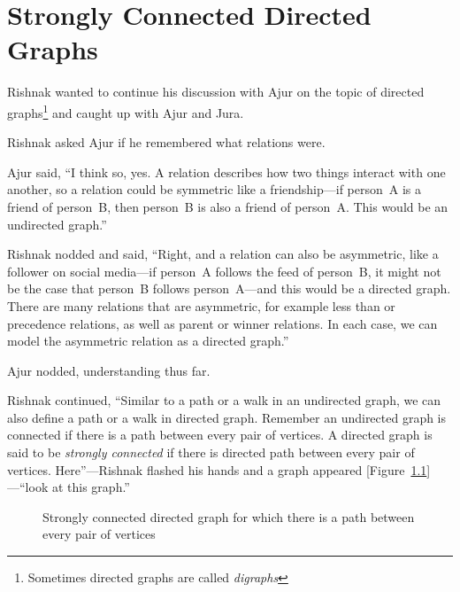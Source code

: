 \chapter{Strongly Connected Directed Graphs}
Rishnak wanted to continue his discussion with Ajur on the topic of directed graphs\footnote{Sometimes directed graphs are called \textit{digraphs}} and caught up with Ajur and Jura.

Rishnak asked Ajur if he remembered what relations were.

Ajur said, ``I think so, yes. A relation describes how two things interact with one another, so a relation could be symmetric like a friendship---if person~A is a friend of person~B, then person~B is also a friend of person~A. This would be an undirected graph.''

Rishnak nodded and said, ``Right, and a relation can also be asymmetric, like a follower on social media---if person~A follows the feed of person~B, it might not be the case that person~B follows person~A---and this would be a directed graph. There are many relations that are asymmetric, for example less than or precedence relations, as well as parent or winner relations. In each case, we can model the asymmetric relation as a directed graph.''

Ajur nodded, understanding thus far.

Rishnak continued, ``Similar to a path or a walk in an undirected graph, we can also define a path or a walk in directed graph. Remember an undirected graph is connected if there is a path between every pair of vertices. A directed graph is said to be \textit{strongly connected} if there is directed path between every pair of vertices. Here''---Rishnak flashed his hands and a graph appeared [Figure~\ref{15g1}]---``look at this graph.''

\begin{figure}
\begin{center}
\caption{Strongly connected directed graph for which there is a path between every pair of vertices}\label{15g1}
\end{center}
\end{figure}

